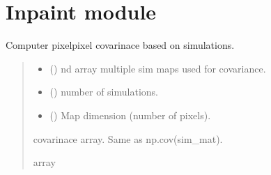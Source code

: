 \documentclass[letterpaper,10pt,english]{sphinxmanual}
\begin{document}
\sphinxstepscope


\chapter{Inpaint module}
\label{\detokenize{inpaint:module-inpaint}}\label{\detokenize{inpaint:inpaint-module}}\label{\detokenize{inpaint::doc}}

\begin{fulllineitems}
\label{\detokenize{inpaint:inpaint.calccov}}
\pysigstartsignatures
{}
\pysigstopsignatures
\sphinxAtStartPar
Computer pixel\sphinxhyphen{}pixel covarinace based on simulations.
\begin{quote}\begin{description}
\begin{itemize}
\item {} 
\sphinxAtStartPar
{} () \textendash{} nd array multiple sim maps used for covariance.

\item {} 
\sphinxAtStartPar
{} () \textendash{} number of simulations.

\item {} 
\sphinxAtStartPar
{} () \textendash{} Map dimension (number of pixels).

\end{itemize}

\sphinxAtStartPar
{} \textendash{} covarinace array.
Same as np.cov(sim\_mat).

\sphinxAtStartPar
array

\end{description}\end{quote}

\end{fulllineitems}
\end{document}
